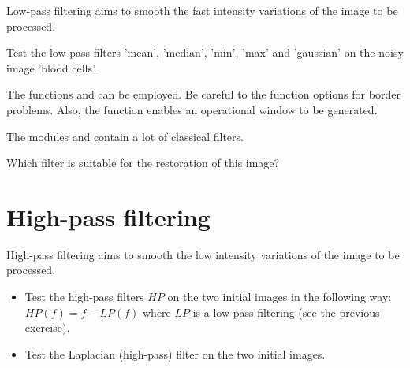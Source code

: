 Low-pass filtering aims to smooth the fast intensity variations of the image to be processed.
\begin{qbox}
Test the low-pass filters 'mean', 'median', 'min', 'max' and 'gaussian' on the noisy image 'blood cells'. 
\end{qbox}

	\begin{mcomment}
\begin{mremark}The \matlabregistered{} functions  and  can be employed.
Be careful to the function options for border problems. Also, the \matlabregistered{} function  enables an operational window to be generated.
\end{mremark}
\end{mcomment}

\begin{pcomment}
\begin{premark}
The modules  and   contain a lot of classical filters.
\end{premark}
\end{pcomment}
\begin{qbox}
Which filter is suitable for the restoration of this image?
\end{qbox}

\section{High-pass filtering}

High-pass filtering aims to smooth the low intensity variations of the image to be processed.
\begin{qbox}
\begin{itemize}
	\item Test the high-pass filters $HP$ on the two initial images in the following way: 
	$HP(f)=f-LP(f)$ where $LP$ is a low-pass filtering (see the previous exercise).
	\item Test the Laplacian \label{lbl:introduction:laplacien}(high-pass) filter on the two initial images.
	
\end{itemize}
\end{qbox}

